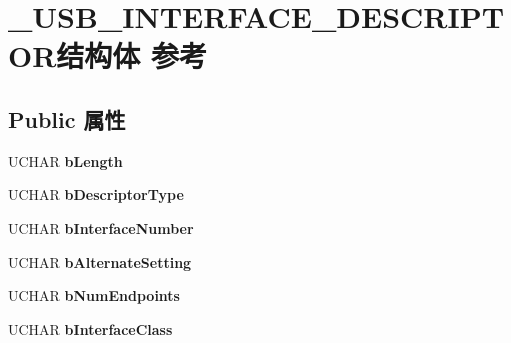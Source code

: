 \hypertarget{struct___u_s_b___i_n_t_e_r_f_a_c_e___d_e_s_c_r_i_p_t_o_r}{}\section{\+\_\+\+U\+S\+B\+\_\+\+I\+N\+T\+E\+R\+F\+A\+C\+E\+\_\+\+D\+E\+S\+C\+R\+I\+P\+T\+O\+R结构体 参考}
\label{struct___u_s_b___i_n_t_e_r_f_a_c_e___d_e_s_c_r_i_p_t_o_r}
\subsection*{Public 属性}
\begin{DoxyCompactItemize}
\item 
\mbox{\label{struct___u_s_b___i_n_t_e_r_f_a_c_e___d_e_s_c_r_i_p_t_o_r_ab4a5ad1117e5a31f5af4161042de87b5}} 
U\+C\+H\+AR {\bfseries b\+Length}
\item 
\mbox{\label{struct___u_s_b___i_n_t_e_r_f_a_c_e___d_e_s_c_r_i_p_t_o_r_a619ff3af478c6437456e26c621557b67}} 
U\+C\+H\+AR {\bfseries b\+Descriptor\+Type}
\item 
\mbox{\label{struct___u_s_b___i_n_t_e_r_f_a_c_e___d_e_s_c_r_i_p_t_o_r_a17975702a72b28491cddbfb15b0f1c55}} 
U\+C\+H\+AR {\bfseries b\+Interface\+Number}
\item 
\mbox{\label{struct___u_s_b___i_n_t_e_r_f_a_c_e___d_e_s_c_r_i_p_t_o_r_aa2a5f9e08cd38757a257fcb54cd9864d}} 
U\+C\+H\+AR {\bfseries b\+Alternate\+Setting}
\item 
\mbox{\label{struct___u_s_b___i_n_t_e_r_f_a_c_e___d_e_s_c_r_i_p_t_o_r_afc9859527b5bbbb87710c957fc17071d}} 
U\+C\+H\+AR {\bfseries b\+Num\+Endpoints}
\item 
\mbox{\label{struct___u_s_b___i_n_t_e_r_f_a_c_e___d_e_s_c_r_i_p_t_o_r_a74970bb95e65d697603ae0261bde75e7}} 
U\+C\+H\+AR {\bfseries b\+Interface\+Class}

\end{DoxyCompactItemize}
